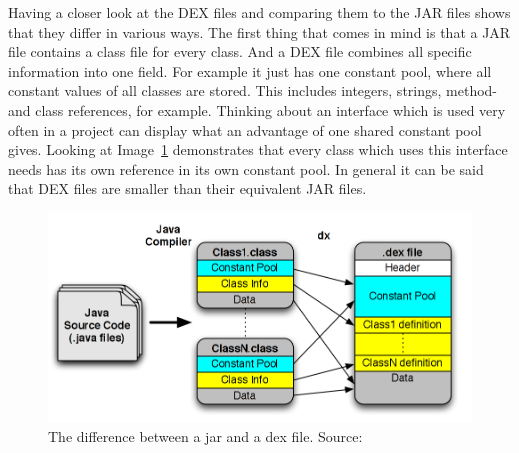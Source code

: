 Having a closer look at the DEX files and comparing them to the JAR files shows that they differ in various ways.
The first thing that comes in mind is that a JAR file contains a class file for every class.
And a DEX file combines all specific information into one field.
For example it just has one constant pool, where all constant values of all classes are stored.
This includes integers, strings, method- and class references, for example.
Thinking about an interface which is used very often in a project can display what an advantage of one shared constant pool gives.
Looking at Image~\ref{fig:jar-dex} demonstrates that every class which uses this interface needs has its own reference in its own constant pool.
In general it can be said that DEX files are smaller than their equivalent JAR files.~\cite{bornstein2008dalvik}\\
\begin{figure}[h]
\begin{center}
\includegraphics[scale=0.41]{images/jar-dex.png} 
\caption{The difference between a jar and a dex file. Source:~\cite{enck2011study}}
\label{fig:jar-dex}
\end{center}
\end{figure}



